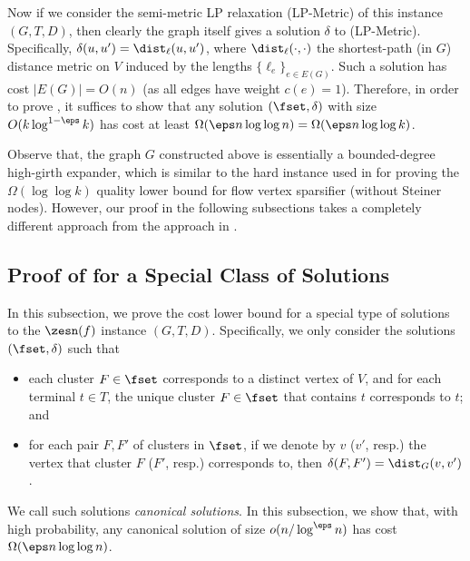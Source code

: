 Now if we consider the semi-metric LP relaxation (\textsf{LP-Metric}) of this instance $(G,T,D)$, then clearly the graph itself gives a solution $\delta$ to (\textsf{LP-Metric}). Specifically, $\delta(u,u')=\dist_{\ell}(u,u')$, where $\dist_{\ell}(\cdot,\cdot)$ the shortest-path (in $G$) distance metric on $V$ induced by the lengths $\{\ell_e\}_{e\in E(G)}$. Such a solution has cost $|E(G)|=O(n)$ (as all edges have weight $c(e)=1$). Therefore, in order to prove , it suffices to show that any solution $(\fset,\delta)$ with size $O(k\log^{1-\eps}k)$ has cost at least $\Omega(\eps n\log\log n)=\Omega(\eps n\log\log k)$.

Observe that, the graph $G$ constructed above is essentially a bounded-degree high-girth expander, which is similar to the hard instance used in \cite{leighton2010extensions} for proving the $\Omega(\log\log k)$ quality lower bound for flow vertex sparsifier (without Steiner nodes). However, our proof in the following subsections takes a completely different approach from the approach in \cite{leighton2010extensions}.






\subsection{Proof of  for a Special Class of Solutions}
\label{subsec: canonical}

In this subsection, we prove the cost lower bound for a special type of solutions to the $\zesn(f)$ instance $(G,T,D)$. Specifically, we only consider the solutions $(\fset, \delta)$ such that 
\begin{itemize}
\item each cluster $F\in \fset$ corresponds to a distinct vertex of $V$, and for each terminal $t\in T$, the unique cluster $F\in \fset$ that contains $t$ corresponds to $t$; and
\item for each pair $F,F'$ of clusters in $\fset$, if we denote by $v$ ($v'$, resp.) the vertex that cluster $F$ ($F'$, resp.) corresponds to, then $\delta(F,F')=\dist_{G}(v,v')$.
\end{itemize}
We call such solutions \emph{canonical solutions}.
%
In this subsection, we show that, with high probability, any canonical solution of size $o(n/\log^{\eps} n)$ has cost $\Omega(\eps n\log \log n)$. 

